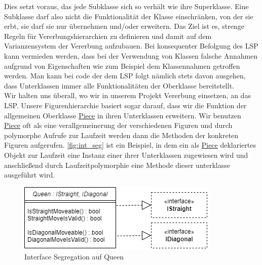 \documentclass[
10pt, %
a4paper, %
oneside, %
headinclude,footinclude, %
BCOR5mm, %
]{scrartcl}
\begin{document}
\begin{onehalfspace}
Dies setzt voraus, das jede Subklasse sich so verhält wie ihre Superklasse. Eine Subklasse darf also nicht die Funktionalität der Klasse einschränken, von der sie erbt, sie darf sie nur übernehmen und/oder erweitern. Das Ziel ist es, strenge Regeln für Vererbungshierarchien zu definieren und damit auf dem Varianzensystem der Vererbung aufzubauen. Bei konsequenter Befolgung des LSP kann vermieden werden, dass bei der Verwendung von Klassen falsche Annahmen aufgrund von Eigenschaften wie zum Beispiel dem Klassennahmen getroffen werden. Man kann bei code der dem LSP folgt nämlich stets davon ausgehen, dass Unterklassen immer alle Funktionalitäten der Oberklasse bereitstellt.
\\
Wir halten uns überall, wo wir in unserem Projekt Vererbung einsetzen, an das LSP. Unsere Figurenhierarchie basiert sogar darauf, dass wir die Funktion der allgemeinen Oberklasse \href{https://github.com/schmida736/Chess-AdvancedSE/blob/main/Chess-AdvancedSE/Game\%20Elements/Pieces/Piece.cs}{Piece} in ihren Unterklassen erweitern. Wir benutzen \href{https://github.com/schmida736/Chess-AdvancedSE/blob/main/Chess-AdvancedSE/Game\%20Elements/Pieces/Piece.cs}{Piece} oft als eine verallgemeinerung der verschiedenen Figuren und durch polymorphe Aufrufe zur Laufzeit werden dann die Methoden der konkreten Figuren aufgerufen. \autoref{fig:int_seg} ist ein Beispiel, in dem ein als \href{https://github.com/schmida736/Chess-AdvancedSE/blob/main/Chess-AdvancedSE/Game\%20Elements/Pieces/Piece.cs}{Piece} deklariertes Objekt zur Laufzeit eine Instanz einer ihrer Unterklassen zugewiesen wird und anschließend durch Laufzeitpolymorphie eine Methode dieser unterklasse ausgeführt wird.

\begin{figure}[ht]
	\centering
	\includegraphics[width=0.5\linewidth]{Diagonal_Straight.png}
	\caption[Interface Segregation auf Queen]{Interface Segregation auf Queen}
	\label{fig:int_seg}
\end{figure}


\end{onehalfspace}
\end{document}
